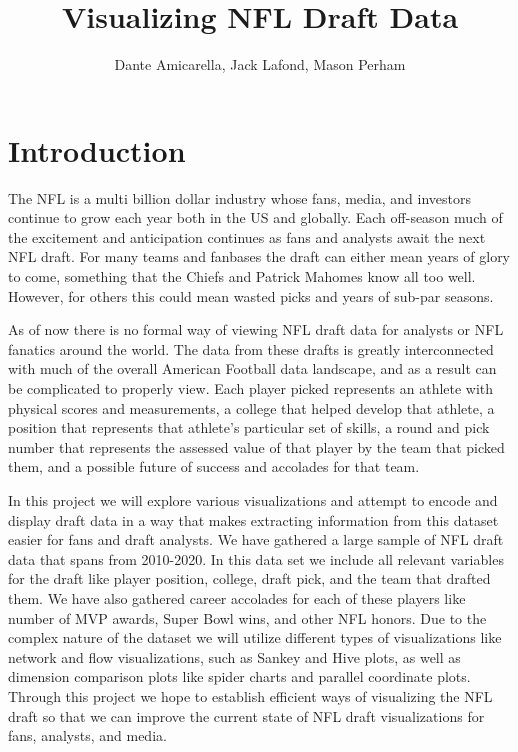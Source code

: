 \documentclass{proc}
\begin{document}
\title{Visualizing NFL Draft Data}

\author{Dante Amicarella, Jack Lafond, Mason Perham}

\maketitle

\section{Introduction}
The NFL is a multi billion dollar industry whose fans, media, and investors continue to grow each year both in the US and globally. Each off-season much of the excitement and anticipation continues as fans and analysts await the next NFL draft. For many teams and fanbases the draft can either mean years of glory to come, something that the Chiefs and Patrick Mahomes know all too well. However, for others this could mean wasted picks and years of sub-par seasons.

As of now there is no formal way of viewing NFL draft data for analysts or NFL fanatics around the world. The data from these drafts is greatly interconnected with much of the overall American Football data landscape, and as a result can be complicated to properly view. Each player picked represents an athlete with physical scores and measurements, a college that helped develop that athlete, a position that represents that athlete's particular set of skills, a round and pick number that represents the assessed value of that player by the team that picked them, and a possible future of success and accolades for that team. 

In this project we will explore various visualizations and attempt to encode and display draft data in a way that makes extracting information from this dataset easier for fans and draft analysts. We have gathered a large sample of NFL draft data that spans from 2010-2020. In this data set we include all relevant variables for the draft like player position, college, draft pick, and the team that drafted them. We have also gathered career accolades for each of these players like number of MVP awards, Super Bowl wins, and other NFL honors. Due to the complex nature of the dataset we will utilize different types of visualizations like network and flow visualizations, such as Sankey and Hive plots, as well as dimension comparison plots like spider charts and parallel coordinate plots. 
Through this project we hope to establish efficient ways of visualizing the NFL draft so that we can improve the current state of NFL draft visualizations for fans, analysts, and media.
\end{document}
